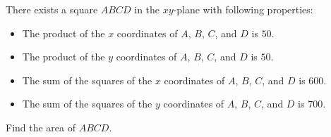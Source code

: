 There exists a square $ABCD$ in the $xy$-plane with following properties:

\begin{itemize}

\item The product of the $x$ coordinates of $A$, $B$, $C$, and $D$ is $50$.

\item The product of the $y$ coordinates of $A$, $B$, $C$, and $D$ is $50$.

\item The sum of the squares of the $x$ coordinates of $A$, $B$, $C$, and $D$ is $600$.

\item The sum of the squares of the $y$ coordinates of $A$, $B$, $C$, and $D$ is $700$.

\end{itemize}

Find the area of $ABCD$.

